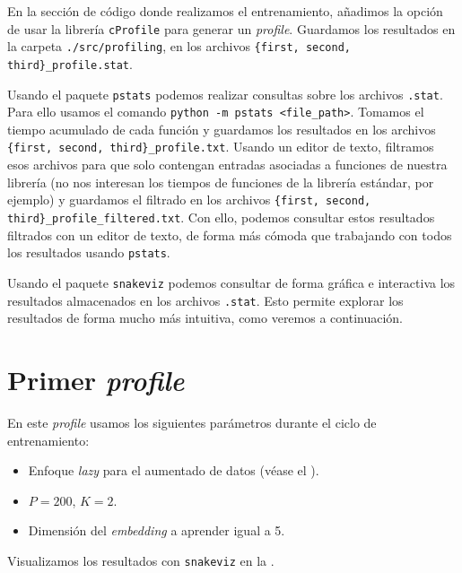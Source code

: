 En la sección de código donde realizamos el entrenamiento, añadimos la opción de usar la librería \lstinline{cProfile} para generar un \textit{profile}. Guardamos los resultados en la carpeta \lstinline{./src/profiling}, en los archivos \lstinline|{first, second, third}_profile.stat|.

Usando el paquete \lstinline{pstats} podemos realizar consultas sobre los archivos \lstinline{.stat}. Para ello usamos el comando \lstinline{python -m pstats <file_path>}. Tomamos el tiempo acumulado de cada función y guardamos los resultados en los archivos \lstinline|{first, second, third}_profile.txt|. Usando un editor de texto, filtramos esos archivos para que solo contengan entradas asociadas a funciones de nuestra librería (no nos interesan los tiempos de funciones de la librería estándar, por ejemplo) y guardamos el filtrado en los archivos \lstinline|{first, second, third}_profile_filtered.txt|. Con ello, podemos consultar estos resultados filtrados con un editor de texto, de forma más cómoda que trabajando con todos los resultados usando \lstinline{pstats}.

Usando el paquete \lstinline{snakeviz} podemos consultar de forma gráfica e interactiva los resultados almacenados en los archivos \lstinline{.stat}. Esto permite explorar los resultados de forma mucho más intuitiva, como veremos a continuación.

\section{Primer \textit{profile}}

En este \textit{profile} usamos los siguientes parámetros durante el ciclo de entrenamiento:

\begin{itemize}
	\item Enfoque \textit{lazy} para el aumentado de datos (véase el ).
	\item $P = 200$, $K = 2$.
	\item Dimensión del \textit{embedding} a aprender igual a 5.
\end{itemize}

Visualizamos los resultados con \lstinline{snakeviz} en la .

